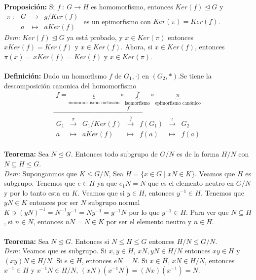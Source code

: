\documentclass{article}
\begin{document}

\textbf{Proposición:} Si $f\::\:G\longrightarrow H$ es homomorfismo, entonces $Ker(f)\trianglelefteq G$ y $
\begin{array}{cccc}
    \pi\::&G&\longrightarrow&g/Ker(f)\\
        &a&\longmapsto&aKer(f)
\end{array}
$ es un epimorfismo con $Ker(\pi)=Ker(f)$.\\
\textit{Dem:} $Ker(f)\trianglelefteq G$ ya está probado, y $x\in Ker(\pi)$ entonces $xKer(f)=Ker(f)$ y $x\in Ker(f)$. Ahora, si $x\in Ker(f)$, entonces $\pi(x)=xKer(f)=Ker(f)$ y $x \in Ker(\pi)$.\\\\


\textbf{Definición:} Dado un homorfismo $f$ de $G_1,\cdot)$ en $(G_2,*)$.Se tiene la descomposición canonica del homomorfismo $$f=\underbrace{\iota}_\text{monomorfismo inclusión} \circ \underbrace{\bar{f}}_\text{isomorfismo} \circ \underbrace{\pi}_\text{epimorfismo canónico}$$
$$
\overset{f}{\overrightarrow{\begin{array}{cccccccccccc}
    G_1&\overset{\pi}{\longrightarrow}&G_1/Ker(f)&\overset{\bar{f}}{\longrightarrow}&f(G_1)&\overset{\iota}{\longrightarrow}&G_2\\
    a&\longmapsto&aKer(f)&\longmapsto&f(a)&\longmapsto&f(a)
\end{array}}}
$$\\


\textbf{Teorema:} Sea $N\trianglelefteq G$. Entonces todo subgrupo de $G/N$ es de la forma $H/N$ con $N\subseteq H \le G$.\\
\textit{Dem:} Suponganmos que $K\le G/N$, Sea $H=\{ x\in G \mid xN\in K \}$. Veamos que $H$ es subgrupo. Tenemos que $e\in H$ ya que $e_1N=N$ que es el elemento neutro en $G/N$ y por lo tanto esta en $K$. Veamos que si $y\in H$, entonces $y^{-1}\in H$. Tenemos que $yN\in K$ entonces por ser $N$ subgrupo normal $K\ni(yN)^{-1}=N^{-1}y^{-1}=Ny^{-1}=y^{-1}N$ por lo que $y^{-1}\in H$. Para ver que $N\subseteq H$, si $n\in N$, entonces $nN=N\in K$ por ser el elemento neutro y $n\in H$.\\\\


\textbf{Teorema:} Sea $N\trianglelefteq G$. Entonces si $N\le H\le G$ entonces $H/N\le G/N$.\\
\textit{Dem:} Veamos que es subgrupo. Si $x,y\in H$, $xN,yN\in H/N$ entonces $xy\in H$ y $(xy)N\in H/N$. Si $e\in H$, entonces $eN=N$. Si $x\in H$, $xN\in H/N$, entonces $x^{-1}\in H$ y $x^{-1}N\in H/N$, $(xN)(x^{-1}N)=(Nx)(x^{-1})=N$.\\\\
\end{document}
